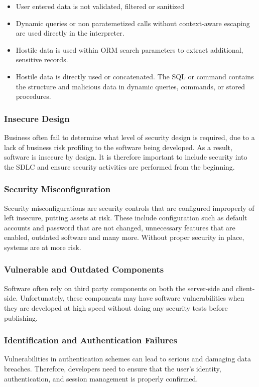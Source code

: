 \begin{itemize}
    \item User entered data is not validated, filtered or sanitized
    \item Dynamic queries or non paratemetized calls without context-aware escaping are used directly in the interpreter.
    \item Hostile data is used within ORM search parameters to extract additional, sensitive records.
    \item Hostile data is directly used or concatenated. The SQL or command contains the structure and malicious data in dynamic queries, commands, or stored procedures.
\end{itemize}

\subsubsection{Insecure Design}
Business often fail to determine what level of security design is required, due to a lack of business risk profiling to the software being developed. As a result, software is insecure by design. It is therefore important to include security into the SDLC and ensure security activities are performed from the beginning.

\subsubsection{Security Misconfiguration}
Security misconfigurations are security controls that are configured improperly of left insecure, putting assets at risk. These include configuration such as default accounts and password that are not changed, unnecessary features that are enabled, outdated software and many more. Without proper security in place, systems are at more risk.

\subsubsection{Vulnerable and Outdated Components}
Software often rely on third party components on both the server-side and client-side. Unfortunately, these components may have software vulnerabilities when they are developed at high speed without doing any security tests before publishing.

\subsubsection{Identification and Authentication Failures}
Vulnerabilities in authentication schemes can lead to serious and damaging data breaches. Therefore, developers need to ensure that the user's identity, authentication, and session management is properly confirmed.


